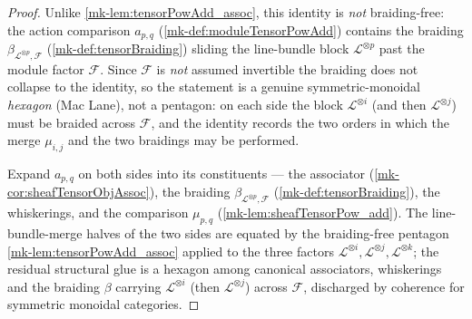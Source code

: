 \begin{proof}
  \leanok
    Unlike \ref{mk-lem:tensorPowAdd_assoc}, this identity is \emph{not} braiding-free:
  the action comparison \(a_{p,q}\) (\ref{mk-def:moduleTensorPowAdd}) contains the
  braiding \(\beta_{\mathcal{L}^{\otimes p},\mathcal{F}}\) (\ref{mk-def:tensorBraiding})
  sliding the line-bundle block \(\mathcal{L}^{\otimes p}\) past the module factor
  \(\mathcal{F}\). Since \(\mathcal{F}\) is \emph{not} assumed invertible the braiding
  does not collapse to the identity, so the statement is a genuine
  symmetric-monoidal \emph{hexagon} (Mac Lane), not a pentagon: on each side the
  block \(\mathcal{L}^{\otimes i}\) (and then \(\mathcal{L}^{\otimes j}\)) must be
  braided across \(\mathcal{F}\), and the identity records the two orders in which
  the merge \(\mu_{i,j}\) and the two braidings may be performed.

  Expand \(a_{p,q}\) on both sides into its constituents --- the associator
  (\ref{mk-cor:sheafTensorObjAssoc}), the braiding
  \(\beta_{\mathcal{L}^{\otimes p},\mathcal{F}}\) (\ref{mk-def:tensorBraiding}), the
  whiskerings, and the comparison \(\mu_{p,q}\) (\ref{mk-lem:sheafTensorPow_add}). The
  line-bundle-merge halves of the two sides are equated by the braiding-free pentagon
  \ref{mk-lem:tensorPowAdd_assoc} applied to the three factors
  \(\mathcal{L}^{\otimes i},\mathcal{L}^{\otimes j},\mathcal{L}^{\otimes k}\); the
  residual structural glue is a hexagon among canonical associators, whiskerings and
  the braiding \(\beta\) carrying \(\mathcal{L}^{\otimes i}\) (then
  \(\mathcal{L}^{\otimes j}\)) across \(\mathcal{F}\), discharged by coherence for
  symmetric monoidal categories.
\end{proof}

